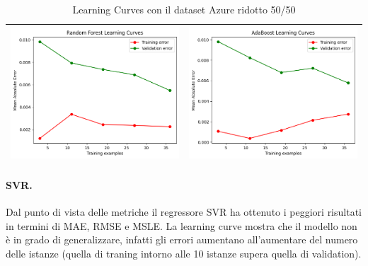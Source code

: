 \begin{table}[H]
\begin{tabularx}{\textwidth}{|X|X|}
        \includegraphics[width=\linewidth, trim=0 0 0 0]{images/RandomForest_lc50_ridottoAzure.png} &
        \includegraphics[width=\linewidth, trim=0 0 0 0]{images/AdaBoost_lc50_ridottoAzure.png} \\
        \hline
    \end{tabularx}
    \caption{Learning Curves con il dataset Azure ridotto 50/50}
    \label{tab:emissions_info}
\end{table}

\paragraph{\textbf{SVR}.}
Dal punto di vista delle metriche il regressore SVR ha ottenuto i peggiori risultati in termini di MAE, RMSE e MSLE. La learning curve mostra che il modello non è in grado di generalizzare, infatti gli errori aumentano all'aumentare del numero delle istanze (quella di traning intorno alle 10 istanze supera quella di validation).

